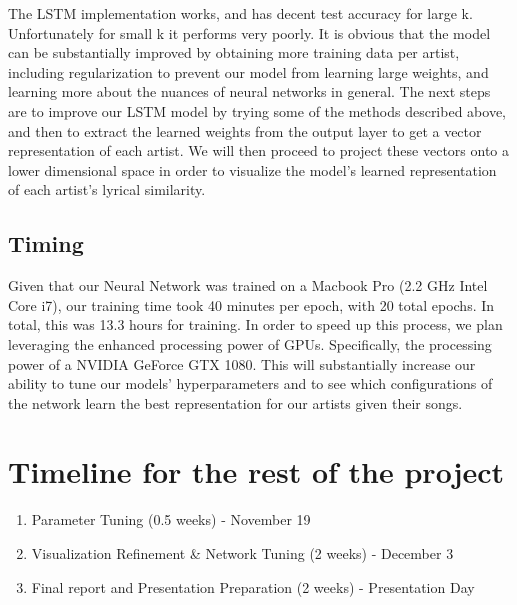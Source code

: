 \documentclass[11pt,a4paper]{article}
\begin{document}
The LSTM implementation works, and has decent test accuracy for large k. Unfortunately for small k it performs very poorly. It is obvious that the model can be substantially improved by obtaining more training data per artist, including regularization to prevent our model from learning large weights, and learning more about the nuances of neural networks in general. The next steps are to improve our LSTM model by trying some of the methods described above, and then to extract the learned weights from the output layer to get a vector representation of each artist. We will then proceed to project these vectors onto a lower dimensional space in order to visualize the model’s learned representation of each artist’s lyrical similarity.

\subsection{Timing}   

Given that our Neural Network was trained on a Macbook Pro (2.2 GHz Intel Core i7), our training time took 40 minutes per epoch, with 20 total epochs. In total, this was 13.3 hours for training. In order to speed up this process, we plan leveraging the enhanced processing power of GPUs. Specifically, the processing power of a NVIDIA GeForce GTX 1080. This will substantially increase our ability to tune our models’ hyperparameters and to see which configurations of the network learn the best representation for our artists given their songs.

    \section{Timeline for the rest of the project}

\begin{enumerate}
    \item Parameter Tuning (0.5 weeks) - November 19
    \item Visualization Refinement \& Network Tuning (2 weeks) - December 3
    \item Final report and Presentation Preparation (2 weeks) - Presentation Day
\end{enumerate}

    
    
    
    \footnotesize
    
    
    
    
\end{document}
